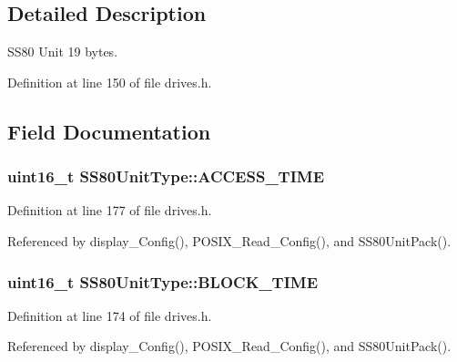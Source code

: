 \subsection{Detailed Description}
S\+S80 Unit 19 bytes. 

Definition at line 150 of file drives.\+h.



\subsection{Field Documentation}
\subsubsection[{\texorpdfstring{A\+C\+C\+E\+S\+S\+\_\+\+T\+I\+ME}{ACCESS_TIME}}]{\setlength{\rightskip}{0pt plus 5cm}uint16\+\_\+t S\+S80\+Unit\+Type\+::\+A\+C\+C\+E\+S\+S\+\_\+\+T\+I\+ME}\hypertarget{structSS80UnitType_ab43ef110f145d428fff831afc18f5e24}{}\label{structSS80UnitType_ab43ef110f145d428fff831afc18f5e24}


Definition at line 177 of file drives.\+h.



Referenced by display\+\_\+\+Config(), P\+O\+S\+I\+X\+\_\+\+Read\+\_\+\+Config(), and S\+S80\+Unit\+Pack().

\subsubsection[{\texorpdfstring{B\+L\+O\+C\+K\+\_\+\+T\+I\+ME}{BLOCK_TIME}}]{\setlength{\rightskip}{0pt plus 5cm}uint16\+\_\+t S\+S80\+Unit\+Type\+::\+B\+L\+O\+C\+K\+\_\+\+T\+I\+ME}\hypertarget{structSS80UnitType_ab94c4b75c74e08e128d4802f5dec0dd5}{}\label{structSS80UnitType_ab94c4b75c74e08e128d4802f5dec0dd5}


Definition at line 174 of file drives.\+h.



Referenced by display\+\_\+\+Config(), P\+O\+S\+I\+X\+\_\+\+Read\+\_\+\+Config(), and S\+S80\+Unit\+Pack().

